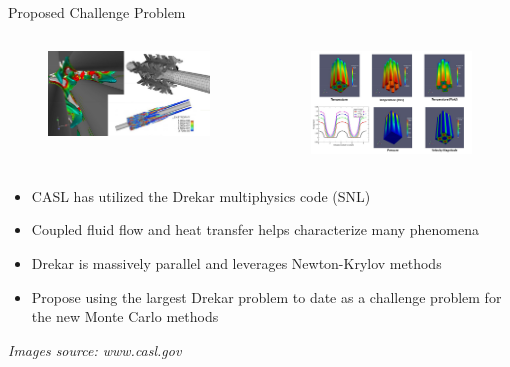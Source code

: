 \documentclass{beamer}
\begin{document}
\begin{frame}{Proposed Challenge Problem}

  \begin{columns}
    \begin{column}{0.5\textwidth}
      \begin{figure}[htpb!]
        \begin{center}
          \includegraphics[width=2.5in]{drekar1.png}
        \end{center}
      \end{figure}
    \end{column}

    \begin{column}{0.5\textwidth}
      \begin{figure}[htpb!]
        \begin{center}
          \includegraphics[width=2.5in]{drekar2.png}
        \end{center}
      \end{figure}
    \end{column}
  \end{columns}

  \begin{itemize}
  \item CASL has utilized the Drekar multiphysics code (SNL)
  \item Coupled fluid flow and heat transfer helps characterize many
    phenomena
  \item Drekar is massively parallel and leverages Newton-Krylov
    methods
  \item Propose using the largest Drekar problem to date as a
    challenge problem for the new Monte Carlo methods
  \end{itemize}

  {\small \sl Images source: www.casl.gov}

\end{frame}
\end{document}
